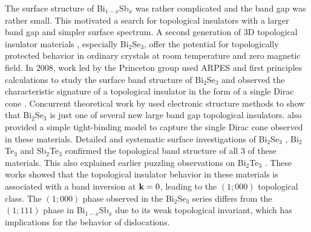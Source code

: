 \documentclass[twocolumn,floatfix,showpacs,rmp,aps]{revtex4}
\begin{document}
	The surface structure of Bi$_{1-x}$Sb$_x$ was
	rather complicated and the band gap was rather small.  This
	motivated a search for topological insulators with a larger band gap
	and simpler surface spectrum.
	A second generation of 3D
	topological insulator materials \cite{moore09}, especially Bi$_2$Se$_3$, offer the
	potential for topologically protected behavior in ordinary crystals
	at room temperature and zero magnetic field.
	In 2008, work led by the Princeton group used ARPES and
	first principles calculations to study the surface band structure of
	Bi$_2$Se$_3$ and observed the characteristic signature of a
	topological insulator in the form of a single Dirac cone \cite{xia09a}.
	Concurrent theoretical work by \textcite{zhangh09}
	used electronic structure methods to show that
	Bi$_2$Se$_3$ is just one of several new large band gap topological
	insulators. \textcite{zhangh09} also provided a simple tight-binding
	model to capture the single Dirac cone observed in these materials.
	Detailed and systematic surface
	investigations of Bi$_2$Se$_3$ \cite{hsieh09b,hor09,park10}, Bi$_2$Te$_3$
	\cite{chen09,hsieh09b,hsieh09c,xia09b} and  Sb$_2$Te$_3$ \cite{hsieh09c}
	confirmed the topological band structure of all 3 of these materials.
	This also explained earlier
	puzzling observations on Bi$_2$Te$_3$ \cite{noh08}.
	These works showed that the topological insulator behavior in
	these materials is associated with a band inversion at ${\bf k}=0$, leading to
	the $(1;000)$ topological class.
	The $(1;000)$ phase observed in the Bi$_2$Se$_3$ series
	differs from the $(1;111)$ phase in Bi$_{1-x}$Sb$_x$ due to its
	weak topological invariant, which has implications for the behavior
	of dislocations\cite{ran09}.
	
\end{document}
